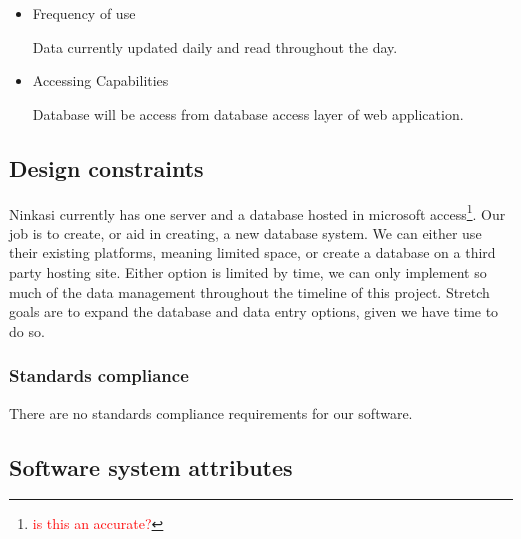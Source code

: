 \documentclass[draftclsnofoot,onecolumn,letterpaper,10pt,compsoc]{IEEEtran}
\newcommand\question[1]{\footnote{\textcolor{red}{#1}}}
\begin{document}
\begin{itemize}
\begin{itemize}
\begin{itemize}
{                        \question{What is this?}
                    }
                    \item{\textbf{pH}: pH level of batch in brewing vat.}
                    \item{\textbf{ABV}: Alcohol By Volumne of batch.}
                    \item{\textbf{Temp}: Temperature of batch.}
                    \item{\textbf{Action}: Action to be taken.}
                    \item{\textbf{By}:
                        \question{Is this the person taking the action?}
                    }
                \end{itemize}
            \end{itemize}
        \item{Frequency of use}

            Data currently updated daily and read throughout the day.

        \item{Accessing Capabilities}

            Database will be access from database access layer of web application.
    \end{itemize}

	\subsection{Design constraints}
		Ninkasi currently has one server and a database hosted in microsoft access\question{is this an accurate?}.
		Our job is to create, or aid in creating, a new database system.
		We can either use their existing platforms, meaning limited space, or create a database on a third party hosting site.
		Either option is limited by time, we can only implement so much of the data management throughout the timeline of this project.
		Stretch goals are to expand the database and data entry options, given we have time to do so.

		\subsubsection{Standards compliance}

		There are no standards compliance requirements for our software.

	\subsection{Software system attributes}
\end{document}
